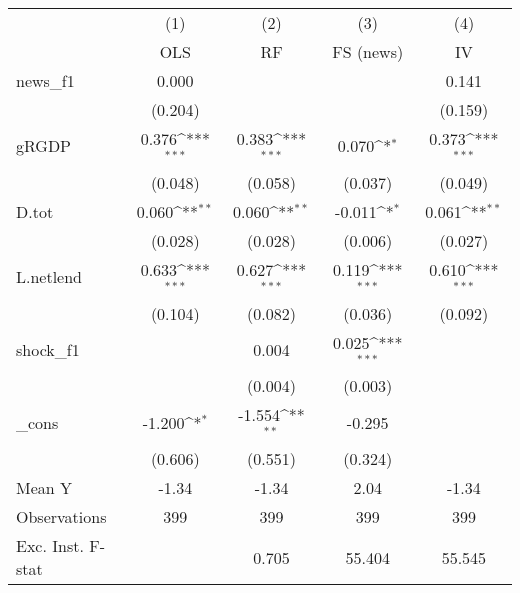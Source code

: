 {
\def\sym#1{\ifmmode^{#1}\else\(^{#1}\)\fi}
\begin{tabular}{l*{4}{c}}
\toprule
            &\multicolumn{1}{c}{(1)}&\multicolumn{1}{c}{(2)}&\multicolumn{1}{c}{(3)}&\multicolumn{1}{c}{(4)}\\
            &\multicolumn{1}{c}{OLS}&\multicolumn{1}{c}{RF}&\multicolumn{1}{c}{FS (news)}&\multicolumn{1}{c}{IV}\\
\midrule
news\_f1     &       0.000         &                     &                     &       0.141         \\
            &     (0.204)         &                     &                     &     (0.159)         \\
\addlinespace
gRGDP       &       0.376\sym{***}&       0.383\sym{***}&       0.070\sym{*}  &       0.373\sym{***}\\
            &     (0.048)         &     (0.058)         &     (0.037)         &     (0.049)         \\
\addlinespace
D.tot       &       0.060\sym{**} &       0.060\sym{**} &      -0.011\sym{*}  &       0.061\sym{**} \\
            &     (0.028)         &     (0.028)         &     (0.006)         &     (0.027)         \\
\addlinespace
L.netlend   &       0.633\sym{***}&       0.627\sym{***}&       0.119\sym{***}&       0.610\sym{***}\\
            &     (0.104)         &     (0.082)         &     (0.036)         &     (0.092)         \\
\addlinespace
shock\_f1    &                     &       0.004         &       0.025\sym{***}&                     \\
            &                     &     (0.004)         &     (0.003)         &                     \\
\addlinespace
\_cons      &      -1.200\sym{*}  &      -1.554\sym{**} &      -0.295         &                     \\
            &     (0.606)         &     (0.551)         &     (0.324)         &                     \\
\midrule
Mean Y      &       -1.34         &       -1.34         &        2.04         &       -1.34         \\
Observations&         399         &         399         &         399         &         399         \\
Exc. Inst. F-stat&                     &       0.705         &      55.404         &      55.545         \\
\bottomrule
\end{tabular}
}
